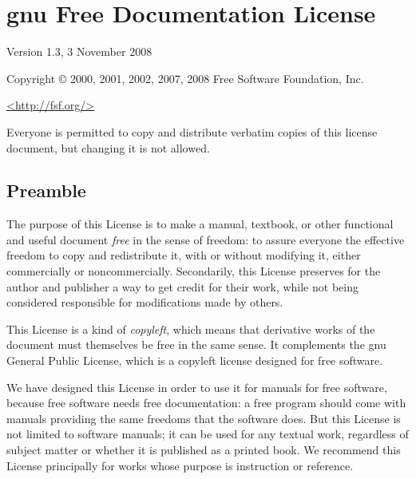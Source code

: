 %
%
%

\chapter[GNU Free Documentation License]{
  \gls{gnu} Free Documentation License}
\label{cha:gnu-free-docum}

\begin{center}

       Version 1.3, 3 November 2008

 Copyright \copyright{} 2000, 2001, 2002, 2007, 2008  Free Software Foundation, Inc.
 
 \bigskip
 
     \url{<http://fsf.org/>}
  
 \bigskip
\end{center}
 
 Everyone is permitted to copy and distribute verbatim copies
 of this license document, but changing it is not allowed.


\section*{Preamble}

The purpose of this License is to make a manual, textbook, or other
functional and useful document \emph{free} in the sense of freedom: to
assure everyone the effective freedom to copy and redistribute it,
with or without modifying it, either commercially or noncommercially.
Secondarily, this License preserves for the author and publisher a way
to get credit for their work, while not being considered responsible
for modifications made by others.

This License is a kind of \emph{copyleft}, which means that derivative
works of the document must themselves be free in the same sense.  It
complements the \gls{gnu} General Public License, which is a copyleft
license designed for free software.

We have designed this License in order to use it for manuals for free
software, because free software needs free documentation: a free
program should come with manuals providing the same freedoms that the
software does.  But this License is not limited to software manuals;
it can be used for any textual work, regardless of subject matter or
whether it is published as a printed book.  We recommend this License
principally for works whose purpose is instruction or reference.


